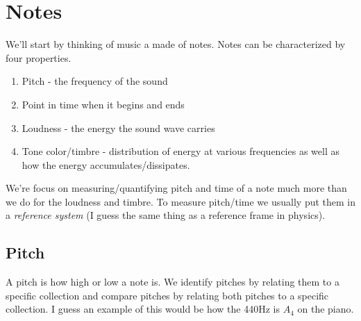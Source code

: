 \documentclass{article}
\begin{document}
\title{}
\author{Delon Shen}
\lstset{language=c++,     numbers=left}
\noindent
\tableofcontents
\section{Notes}
We'll start by thinking of music a made of notes. Notes can be characterized by four properties.
\begin{enumerate}
  \item Pitch - the frequency of the sound
  \item Point in time when it begins and ends
  \item Loudness - the energy the sound wave carries
  \item Tone color/timbre - distribution of energy at various frequencies as well as how the energy accumulates/dissipates.
\end{enumerate}
We're focus on measuring/quantifying pitch and time of a note much more than we do for the loudness and timbre. To measure pitch/time we usually put them in a \textit{reference system} (I guess the same thing as a reference frame in physics). 
\subsection{Pitch}
A pitch is how high or low a note is. We identify pitches by relating them to a specific collection and compare pitches by relating both pitches to a specific collection. I guess an example of this would be how the 440Hz is $A_4$ on the piano.\\
\end{document}
